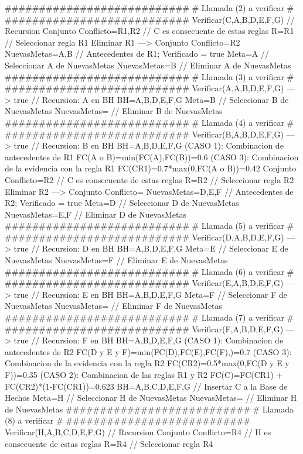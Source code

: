 \begin{listing}[language=Pascal]
  ###########################
  # Llamada (2) a verificar #
  ###########################
	Verificar(C,{A,B,D,E,F,G}) // Recursion 
	Conjunto Conflicto={R1,R2} // C es consecuente de estas reglas
	R={R1} // Seleccionar regla R1
	Eliminar R1 ---> Conjunto Conflicto={R2}
	NuevasMetas={A,B} // Antecedentes de R1; Verificado = true
	Meta=A // Seleccionar A de NuevasMetas
	NuevasMetas={B} // Eliminar A de NuevasMetas
  ###########################
  # Llamada (3) a verificar #
  ###########################
	Verificar(A,{A,B,D,E,F,G}) ---> true // Recursion: A en BH
	BH={A,B,D,E,F,G}
	Meta=B // Seleccionar B de NuevasMetas
	NuevasMetas={} // Eliminar B de NuevasMetas
  ###########################
  # Llamada (4) a verificar #
  ###########################
	Verificar(B,{A,B,D,E,F,G}) ---> true // Recursion: B en BH
	BH={A,B,D,E,F,G}
	(CASO 1): Combinacion de antecedentes de R1
	 FC(A o B)=min(FC(A),FC(B))=0.6
	(CASO 3): Combinacion de la evidencia con la regla R1
	 FC(C{R1})=0.7*max(0,FC(A o B))=0.42
	Conjunto Conflicto={R2} // C es consecuente de estas reglas
	R={R2} // Seleccionar regla R2
	Eliminar R2 ---> Conjunto Conflicto={}
	NuevasMetas={D,E,F} // Antecedentes de R2; Verificado = true
	Meta=D // Seleccionar D de NuevasMetas
	NuevasMetas={E,F} // Eliminar D de NuevasMetas
  ###########################
  # Llamada (5) a verificar #
  ###########################
	Verificar(D,{A,B,D,E,F,G}) ---> true // Recursion: D en BH
	BH={A,B,D,E,F,G}
	Meta=E // Seleccionar E de NuevasMetas
	NuevasMetas={F} // Eliminar E de NuevasMetas
  ###########################
  # Llamada (6) a verificar #
  ###########################
	Verificar(E,{A,B,D,E,F,G}) ---> true // Recursion: E en BH
	BH={A,B,D,E,F,G}
	Meta=F // Seleccionar F de NuevasMetas
	NuevasMetas={} // Eliminar F de NuevasMetas
  ###########################
  # Llamada (7) a verificar #
  ###########################
	Verificar(F,{A,B,D,E,F,G}) ---> true // Recursion: F en BH
	BH={A,B,D,E,F,G}
	(CASO 1): Combinacion de antecedentes de R2
	 FC(D y E y F)=min(FC(D),FC(E),FC(F),)=0.7
	(CASO 3): Combinacion de la evidencia con la regla R2
	 FC(C{R2})=0.5*max(0,FC(D y E y F))=0.35
	(CASO 2): Combinacion de las reglas R1 y R2
	 FC(C)=FC(C{R1}) + FC(C{R2})*(1-FC(C{R1}))=0.623
	BH={A,B,C,D,E,F,G} // Insertar C a la Base de Hechos
	Meta=H // Seleccionar H de NuevasMetas
	NuevasMetas={} // Eliminar H de NuevasMetas
  ###########################
  # Llamada (8) a verificar #
  ###########################
	Verificar(H,{A,B,C,D,E,F,G}) // Recursion 
	Conjunto Conflicto={R4} // H es consecuente de estas reglas
	R={R4} // Seleccionar regla R4

\end{listing}
